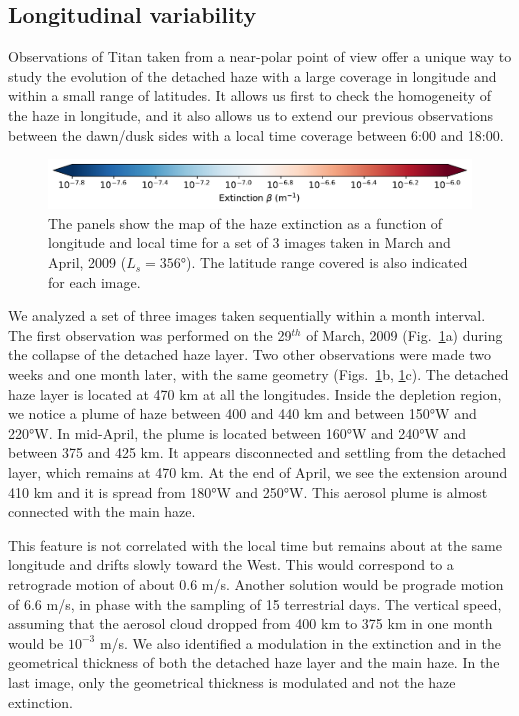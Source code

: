 \subsection{Longitudinal variability}

Observations of Titan taken from a near-polar point of view offer a unique way to study the evolution of
the detached haze with a large coverage in longitude and within a small range of latitudes. It allows us
first to check the homogeneity of the haze in longitude, and it also allows us to extend our previous
observations between the dawn/dusk sides with a local time coverage between 6:00 and 18:00.

\begin{figure}[!ht]
\includegraphics[width=.5\textwidth]{Fig/Extinction_colorbar}
\caption{The panels show the map of the haze extinction as a function of longitude and local
time for a set of 3 images taken in March and April, 2009 ($L_s=\ang{356}$). The latitude range covered is
also indicated for each image.}
\label{fig:lon_variability}
\end{figure}

We analyzed a set of three images taken sequentially within a month interval. The first observation
was performed on the 29$^{th}$ of March, 2009 (Fig.~\ref{fig:lon_variability}a) during the collapse of the detached
haze layer. Two other observations were made two weeks and one month later, with the same geometry
(Figs.~\ref{fig:lon_variability}b, \ref{fig:lon_variability}c). The detached haze layer is
located at 470 km at all the longitudes. Inside the depletion region, we notice a plume of haze
between 400 and 440 km and between \ang{150}W and \ang{220}W. In mid-April, the plume is located between
\ang{160}W and \ang{240}W and between 375 and 425 km. It appears disconnected and settling from the detached
layer, which remains at 470 km. At the end of April, we see the extension around 410 km and it
is spread from \ang{180}W and \ang{250}W. This aerosol plume is almost connected with the main haze.

This feature is not correlated with the local time but remains about at the same longitude and drifts slowly
toward the West. This would correspond to a retrograde motion of about 0.6 m/s. Another solution would be
prograde motion of 6.6 m/s, in phase with the sampling of 15 terrestrial days. The vertical speed, assuming
that the aerosol cloud dropped from 400 km to 375 km in one month would be $10^{-3}$ m/s. We also identified a
modulation in the extinction and in the geometrical thickness of both the detached haze layer and the main
haze. In the last image, only the geometrical thickness is modulated and not the haze extinction.


